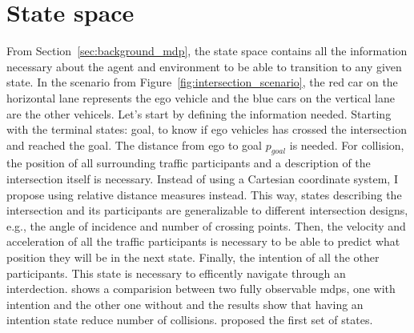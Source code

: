 
	




\section{State space}
From Section~\ref{sec:background_mdp}, the state space contains all the information necessary about the agent and environment to be able to transition to any given state. In the scenario from Figure~\ref{fig:intersection_scenario}, the red car on the horizontal lane represents the ego vehicle and the blue cars on the vertical lane are the other vehicels. 
Let's start by defining the information needed. Starting with the terminal states: goal, to know if ego vehicles has crossed the intersection and reached the goal. The distance from ego to goal $p_{goal}$ is needed. For collision, the position of all surrounding traffic participants and a description of the intersection itself is necessary. Instead of using a Cartesian coordinate system, I propose using relative distance measures instead. This way, states describing the intersection and its participants are generalizable to different intersection designs, e.g., the angle of incidence and number of crossing points. 
Then, the velocity and acceleration of all the traffic participants is necessary to be able to predict what position they will be in the next state. Finally, the intention of all the other participants. This state is necessary to efficently navigate through an interdection. \paperBelief shows a comparision between two fully observable \gls{mdp}s, one with intention and the other one without and the results show that having an intention state reduce number of collisions. 
\paperLSTM proposed the first set of states. %

